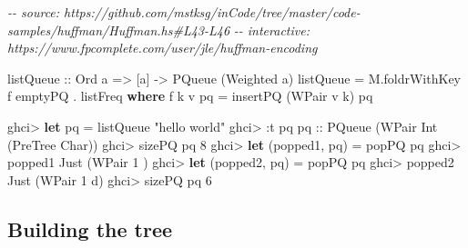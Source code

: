 \documentclass[]{article}
\newenvironment{Shaded}{}{}
\newcommand{\CharTok}[1]{\textcolor[rgb]{0.25,0.44,0.63}{#1}}
\newcommand{\CommentTok}[1]{\textcolor[rgb]{0.38,0.63,0.69}{\textit{#1}}}
\newcommand{\DataTypeTok}[1]{\textcolor[rgb]{0.56,0.13,0.00}{#1}}
\newcommand{\DecValTok}[1]{\textcolor[rgb]{0.25,0.63,0.44}{#1}}
\newcommand{\KeywordTok}[1]{\textcolor[rgb]{0.00,0.44,0.13}{\textbf{#1}}}
\newcommand{\NormalTok}[1]{#1}
\newcommand{\OperatorTok}[1]{\textcolor[rgb]{0.40,0.40,0.40}{#1}}
\newcommand{\OtherTok}[1]{\textcolor[rgb]{0.00,0.44,0.13}{#1}}
\newcommand{\StringTok}[1]{\textcolor[rgb]{0.25,0.44,0.63}{#1}}
\begin{document}
\begin{Shaded}
\begin{Highlighting}[]
\CommentTok{{-}{-} source: https://github.com/mstksg/inCode/tree/master/code{-}samples/huffman/Huffman.hs\#L43{-}L46}
\CommentTok{{-}{-} interactive: https://www.fpcomplete.com/user/jle/huffman{-}encoding}

\OtherTok{listQueue ::} \DataTypeTok{Ord}\NormalTok{ a }\OtherTok{=\textgreater{}}\NormalTok{ [a] }\OtherTok{{-}\textgreater{}} \DataTypeTok{PQueue}\NormalTok{ (}\DataTypeTok{Weighted}\NormalTok{ a)}
\NormalTok{listQueue }\OtherTok{=}\NormalTok{ M.foldrWithKey f emptyPQ }\OperatorTok{.}\NormalTok{ listFreq}
  \KeywordTok{where}
\NormalTok{    f k v pq }\OtherTok{=}\NormalTok{ insertPQ (}\DataTypeTok{WPair}\NormalTok{ v k) pq}
\end{Highlighting}
\end{Shaded}

\begin{Shaded}
\begin{Highlighting}[]
\NormalTok{ghci}\OperatorTok{\textgreater{}} \KeywordTok{let}\NormalTok{ pq }\OtherTok{=}\NormalTok{ listQueue }\StringTok{"hello world"}
\NormalTok{ghci}\OperatorTok{\textgreater{}} \OperatorTok{:}\NormalTok{t pq}
\OtherTok{pq ::} \DataTypeTok{PQueue}\NormalTok{ (}\DataTypeTok{WPair} \DataTypeTok{Int}\NormalTok{ (}\DataTypeTok{PreTree} \DataTypeTok{Char}\NormalTok{))}
\NormalTok{ghci}\OperatorTok{\textgreater{}}\NormalTok{ sizePQ pq}
\DecValTok{8}
\NormalTok{ghci}\OperatorTok{\textgreater{}} \KeywordTok{let}\NormalTok{ (popped1, pq\textquotesingle{}) }\OtherTok{=}\NormalTok{ popPQ pq}
\NormalTok{ghci}\OperatorTok{\textgreater{}}\NormalTok{ popped1}
\DataTypeTok{Just}\NormalTok{ (}\DataTypeTok{WPair} \DecValTok{1} \CharTok{\textquotesingle{} \textquotesingle{}}\NormalTok{)}
\NormalTok{ghci}\OperatorTok{\textgreater{}} \KeywordTok{let}\NormalTok{ (popped2, pq\textquotesingle{}\textquotesingle{}) }\OtherTok{=}\NormalTok{ popPQ pq\textquotesingle{}}
\NormalTok{ghci}\OperatorTok{\textgreater{}}\NormalTok{ popped2}
\DataTypeTok{Just}\NormalTok{ (}\DataTypeTok{WPair} \DecValTok{1} \CharTok{\textquotesingle{}d\textquotesingle{}}\NormalTok{)}
\NormalTok{ghci}\OperatorTok{\textgreater{}}\NormalTok{ sizePQ pq\textquotesingle{}\textquotesingle{}}
\DecValTok{6}
\end{Highlighting}
\end{Shaded}

\subsection{Building the tree}\label{building-the-tree}
\end{document}
